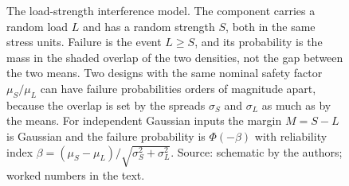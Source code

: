 \begin{figure}[htbp]
\begin{tikzpicture}[x=1.4cm, y=3.0cm, font=\small]
\end{tikzpicture}
\caption[Load-strength interference]{The load-strength interference
model. The component carries a random load $L$ and has a random
strength $S$, both in the same stress units. Failure is the event
$L \geq S$, and its probability is the mass in the shaded overlap of
the two densities, not the gap between the two means. Two designs with
the same nominal safety factor $\mu_S/\mu_L$ can have failure
probabilities orders of magnitude apart, because the overlap is set by
the spreads $\sigma_S$ and $\sigma_L$ as much as by the means. For
independent Gaussian inputs the margin $M = S - L$ is Gaussian and the
failure probability is $\Phi(-\beta)$ with reliability index $\beta =
(\mu_S - \mu_L)/\sqrt{\sigma_S^2 + \sigma_L^2}$. Source: schematic by
the authors; worked numbers in the text.}
\label{fig:vol02:ch13:load-strength}
\end{figure}
